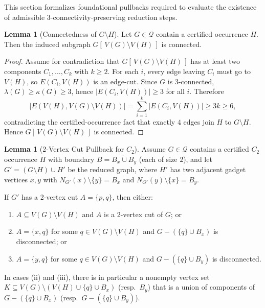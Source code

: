 \documentclass[12pt]{article}
\theoremstyle{definition}
\newtheorem{lemma}[theorem]{Lemma}
\begin{document}
This section formalizes foundational pullbacks required to evaluate the existence of admissible 3-connectivity-preserving reduction steps.

\begin{lemma}[Connectedness of $G \setminus H$]
\label{lem:isolated_neighborhood}
Let $G \in \mathcal{Q}$ contain a certified occurrence $H$. Then the induced subgraph
$G[\,V(G)\setminus V(H)\,]$ is connected.
\end{lemma}
\begin{proof}
Assume for contradiction that $G[\,V(G)\setminus V(H)\,]$ has at least two components
$C_1,\dots,C_k$ with $k\ge 2$.
For each $i$, every edge leaving $C_i$ must go to $V(H)$, so $E(C_i,V(H))$ is an edge-cut.
Since $G$ is 3-connected, $\lambda(G)\ge \kappa(G)\ge 3$, hence $|E(C_i,V(H))|\ge 3$ for all $i$.
Therefore
\[
|E(V(H),V(G)\setminus V(H))|
=\sum_{i=1}^k |E(C_i,V(H))|
\ge 3k \ge 6,
\]
contradicting the certified-occurrence fact that exactly $4$ edges join $H$ to $G\setminus H$.
Hence $G[\,V(G)\setminus V(H)\,]$ is connected.
\end{proof}

\begin{lemma}[2-Vertex Cut Pullback for $C_2$]
\label{lem:pullback_cut_c2}
Assume $G\in\mathcal{Q}$ contains a certified $C_2$ occurrence $H$ with boundary
$B=B_x\dot\cup B_y$ (each of size $2$), and let $G'=(G\setminus H)\cup H'$ be the reduced graph,
where $H'$ has two adjacent gadget vertices $x,y$ with $N_{G'}(x)\setminus\{y\}=B_x$ and
$N_{G'}(y)\setminus\{x\}=B_y$.

If $G'$ has a 2-vertex cut $A=\{p,q\}$, then either:
\begin{enumerate}
\item[(i)] $A\subseteq V(G)\setminus V(H)$ and $A$ is a 2-vertex cut of $G$; or
\item[(ii)] $A=\{x,q\}$ for some $q\in V(G)\setminus V(H)$ and $G-(\{q\}\cup B_x)$ is disconnected; or
\item[(iii)] $A=\{y,q\}$ for some $q\in V(G)\setminus V(H)$ and $G-(\{q\}\cup B_y)$ is disconnected.
\end{enumerate}
In cases (ii) and (iii), there is in particular a nonempty vertex set
$K\subseteq V(G)\setminus (V(H)\cup\{q\}\cup B_x)$ (resp.\ $B_y$) that is a union of components of
$G-(\{q\}\cup B_x)$ (resp.\ $G-(\{q\}\cup B_y)$).
\end{lemma}
\end{document}
